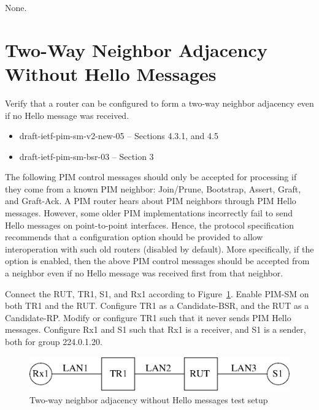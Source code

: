 \documentclass[11pt]{report}
\begin{document}
None.

\newpage
\section{Two-Way Neighbor Adjacency Without Hello Messages}

Verify that a router can be configured to form a two-way neighbor adjacency
even if no Hello message was received.

\begin{itemize}
  \item draft-ietf-pim-sm-v2-new-05 -- Sections 4.3.1, and 4.5
  \item draft-ietf-pim-sm-bsr-03 -- Section 3
\end{itemize}

The following PIM control messages should only be accepted for processing if
they come from a known PIM neighbor: Join/Prune, Bootstrap, Assert, Graft, and
Graft-Ack. A PIM router hears about PIM neighbors
through PIM Hello messages. However, some older PIM implementations
incorrectly fail to send Hello messages on point-to-point interfaces. Hence,
the protocol specification recommends that a configuration option should be
provided to allow 
interoperation with such old routers (disabled by default). More specifically,
if the option is enabled, then the above PIM control messages should be
accepted from a neighbor even if no Hello message was received first from that
neighbor.

Connect the RUT, TR1, S1, and Rx1 according to
Figure~\ref{fig:pim_test_2_7_two_way_neighbor_adjacency_without_hello_messages}.
Enable PIM-SM on both TR1 and the RUT. Configure TR1
as a Candidate-BSR, and the RUT as a Candidate-RP. Modify or configure TR1
such that it never sends PIM Hello messages. Configure Rx1 and S1 such
that Rx1 is a receiver, and S1 is a sender, both for group 224.0.1.20.

\begin{figure}[htbp]
  \begin{center}
    \includegraphics[scale=0.8]{figs/pim_test_2_7_two_way_neighbor_adjacency_without_hello_messages}
    \caption{Two-way neighbor adjacency without Hello messages test
    setup}
    \label{fig:pim_test_2_7_two_way_neighbor_adjacency_without_hello_messages}
  \end{center}
\end{figure}
\end{document}
